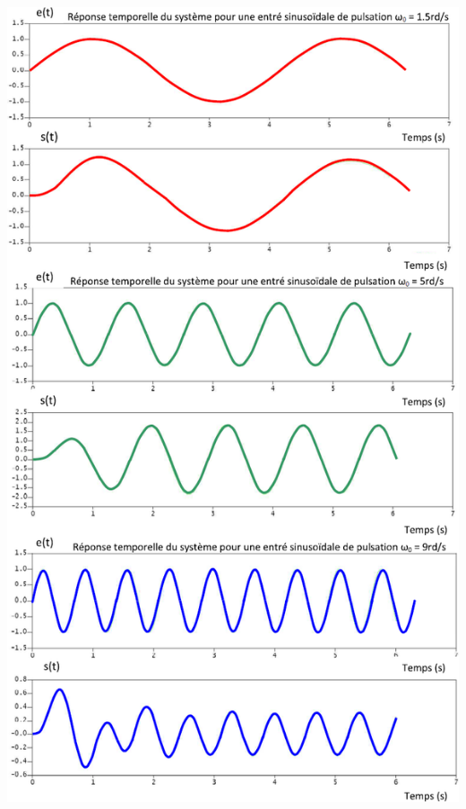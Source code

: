 \documentclass[10pt,fleqn]{article} %
\begin{document}
\begin{center}
\includegraphics[height=\textheight]{images/cor_03}
\end{center}
\else
\fi
\end{document}
